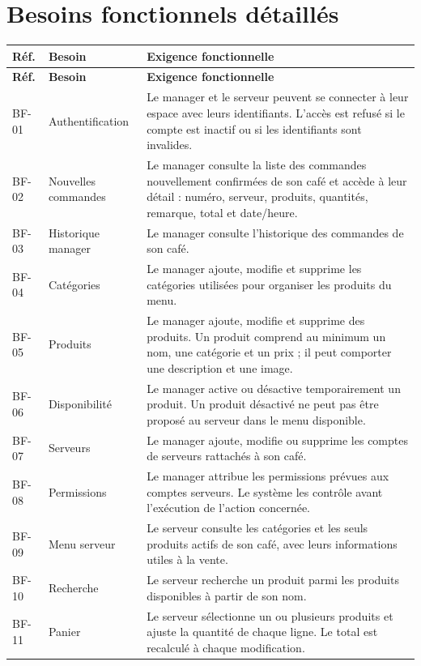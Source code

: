 \documentclass[11pt,a4paper]{article}
\begin{document}
\section{Besoins fonctionnels détaillés}
\begin{longtable}{P{0.12\textwidth}P{0.24\textwidth}P{0.55\textwidth}}
\toprule
\textbf{Réf.} & \textbf{Besoin} & \textbf{Exigence fonctionnelle} \\
\midrule
\endfirsthead
\toprule
\textbf{Réf.} & \textbf{Besoin} & \textbf{Exigence fonctionnelle} \\
\midrule
\endhead
BF-01 & Authentification & Le manager et le serveur peuvent se connecter à leur espace avec leurs identifiants. L’accès est refusé si le compte est inactif ou si les identifiants sont invalides. \\
BF-02 & Nouvelles commandes & Le manager consulte la liste des commandes nouvellement confirmées de son café et accède à leur détail : numéro, serveur, produits, quantités, remarque, total et date/heure. \\
BF-03 & Historique manager & Le manager consulte l’historique des commandes de son café. \\
BF-04 & Catégories & Le manager ajoute, modifie et supprime les catégories utilisées pour organiser les produits du menu. \\
BF-05 & Produits & Le manager ajoute, modifie et supprime des produits. Un produit comprend au minimum un nom, une catégorie et un prix ; il peut comporter une description et une image. \\
BF-06 & Disponibilité & Le manager active ou désactive temporairement un produit. Un produit désactivé ne peut pas être proposé au serveur dans le menu disponible. \\
BF-07 & Serveurs & Le manager ajoute, modifie ou supprime les comptes de serveurs rattachés à son café. \\
BF-08 & Permissions & Le manager attribue les permissions prévues aux comptes serveurs. Le système les contrôle avant l’exécution de l’action concernée. \\
BF-09 & Menu serveur & Le serveur consulte les catégories et les seuls produits actifs de son café, avec leurs informations utiles à la vente. \\
BF-10 & Recherche & Le serveur recherche un produit parmi les produits disponibles à partir de son nom. \\
BF-11 & Panier & Le serveur sélectionne un ou plusieurs produits et ajuste la quantité de chaque ligne. Le total est recalculé à chaque modification. \\

\end{longtable}
\end{document}
